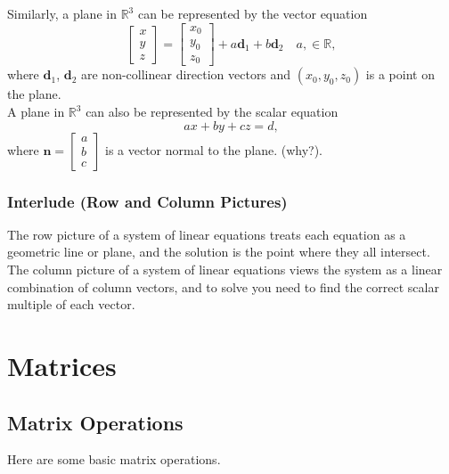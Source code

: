 \documentclass[11pt]{scrartcl}
\theoremstyle{plain}
\theoremstyle{definition}
\theoremstyle{remark}
\begin{document}
Similarly, a plane in $\mathbb{R}^{3}$ can be represented by the vector equation
\[ \begin{bmatrix}x \\ y \\z\end{bmatrix}=\begin{bmatrix}x_{0} \\ y_{0} \\z_{0}\end{bmatrix}+a\mathbf{d}_{1}+
b\mathbf{d}_{2}\quad a,\in \mathbb{R}, \]
where $\mathbf{d}_{1}$, $\mathbf{d}_{2}$ are non-collinear direction vectors and $(x_{0},y_{0},z_{0})$ is a point 
on the plane. \\

A plane in $\mathbb{R}^{3}$ can also be represented by the scalar equation
\[ ax+by+cz=d, \]
where $\mathbf{n}=\begin{bmatrix}a \\ b \\ c\end{bmatrix}$ is a vector normal to the plane. (why?).

\subsubsection{Interlude (Row and Column Pictures)}

The row picture of a system of linear equations treats each equation as a geometric line or plane, and the solution 
is the point where they all intersect. \\

The column picture of a system of linear equations views the system as a linear combination of column vectors, and 
to solve you need to find the correct scalar multiple of each vector. 

\newpage
\section{Matrices}
\subsection{Matrix Operations}

Here are some basic matrix operations.
\end{document}
